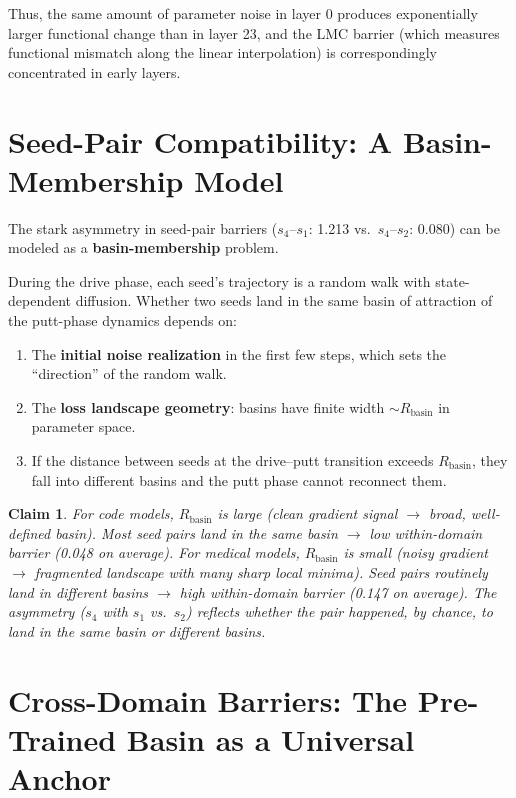 \documentclass{article}
\newtheorem{claim}{Claim}
\begin{document}
Thus, the same amount of parameter noise in layer 0 produces exponentially
larger functional change than in layer 23, and the LMC barrier (which measures
functional mismatch along the linear interpolation) is correspondingly
concentrated in early layers.

\section{Seed-Pair Compatibility: A Basin-Membership Model}

The stark asymmetry in seed-pair barriers ($s_4$--$s_1$: 1.213 vs.\
$s_4$--$s_2$: 0.080) can be modeled as a \textbf{basin-membership} problem.

During the drive phase, each seed's trajectory is a random walk with
state-dependent diffusion.  Whether two seeds land in the same basin of
attraction of the putt-phase dynamics depends on:
\begin{enumerate}
\item The \textbf{initial noise realization} in the first few steps,
      which sets the ``direction'' of the random walk.
\item The \textbf{loss landscape geometry}: basins have finite width
      $\sim R_{\text{basin}}$ in parameter space.
\item If the distance between seeds at the drive--putt transition
      exceeds $R_{\text{basin}}$, they fall into different basins and
      the putt phase cannot reconnect them.
\end{enumerate}

\begin{claim}
For code models, $R_{\text{basin}}$ is large (clean gradient signal $\to$
broad, well-defined basin).  Most seed pairs land in the same basin
$\to$ low within-domain barrier (0.048 on average).  For medical models,
$R_{\text{basin}}$ is small (noisy gradient $\to$ fragmented landscape with
many sharp local minima).  Seed pairs routinely land in different basins
$\to$ high within-domain barrier (0.147 on average).  The asymmetry
($s_4$ with $s_1$ vs.\ $s_2$) reflects whether the pair happened, by
chance, to land in the same basin or different basins.
\end{claim}

\section{Cross-Domain Barriers: The Pre-Trained Basin as a Universal Anchor}
\end{document}
